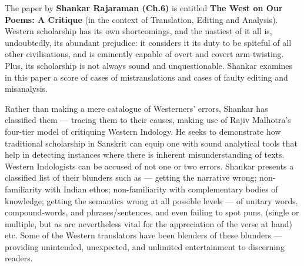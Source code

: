 The paper by {\bf Shankar Rajaraman (Ch.\@ 6)} is entitled {\bf The West on Our Poems: A Critique} (in the context of Translation, Editing and Analysis). Western scholarship has its own shortcomings, and the nastiest of it all is, undoubtedly, its abundant prejudice: it considers it its duty to be spiteful of all other civilisations, and is eminently capable of overt and covert arm-twisting. Plus, its scholarship is not always sound and unquestionable. Shankar examines in this paper a score of cases of mistranslations and cases of faulty editing and misanalysis. 

Rather than making a mere catalogue of Westerners’ errors, Shankar has classified them --- tracing them to their causes, making use of Rajiv Malhotra’s four-tier model of critiquing Western Indology. He seeks to demonstrate how traditional scholarship in Sanskrit can equip one with sound analytical tools that help in detecting instances where there is inherent misunderstanding of texts. Western Indologists can be accused of not one or two errors. Shankar presents a classified list of their blunders such as --- getting the narrative wrong; \hbox{non-familiarity} with Indian ethos; non-familiarity with complementary bodies of knowledge; getting the semantics wrong at all possible levels --- of unitary words, compound-words, and phrases/sentences, and even failing to spot puns, (single or multiple, but as are nevertheless vital for the appreciation of the verse at hand) etc. Some of the Western translators have been blenders of these blunders --- providing unintended, unexpected, and unlimited entertainment to discerning readers. 

